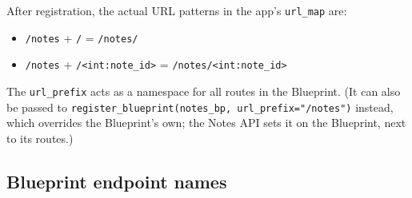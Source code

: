 \begin{codebox}[short]

\begin{Shaded}
\begin{Highlighting}[]
\OperatorTok{=}\NormalTok{, }\OperatorTok{=}\NormalTok{)}


\NormalTok{(}\NormalTok{)              }

\NormalTok{(}\NormalTok{)  }
\end{Highlighting}
\end{Shaded}

\end{codebox}

\noindent{}After registration, the actual URL patterns in the app's \texttt{url\_map} are:

\begin{itemize}
\tightlist
\item
  \texttt{/notes} + \texttt{/} = \texttt{/notes/}
\item
  \texttt{/notes} + \texttt{/\textless{}int:note\_id\textgreater{}} = \texttt{/}\allowbreak{}\texttt{notes/}\allowbreak{}\texttt{\textless{}int:note\_id\textgreater{}}
\end{itemize}

\noindent{}The \texttt{url\_prefix} acts as a namespace for all routes in the Blueprint. (It can also be passed to \texttt{register\_}\allowbreak{}\texttt{blueprint(notes\_}\allowbreak{}\texttt{bp,}\allowbreak{}\texttt{\ url\_}\allowbreak{}\texttt{prefix=}\allowbreak{}\texttt{"/}\allowbreak{}\texttt{notes")} instead, which overrides the Blueprint's own; the Notes API sets it on the Blueprint, next to its routes.)

\subsection*{Blueprint endpoint names}\label{32-routing:blueprint-endpoint-names}

